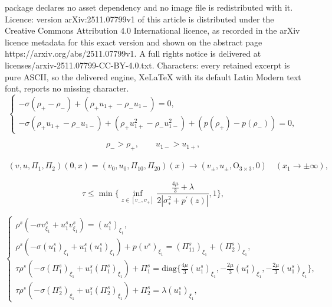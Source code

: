 \documentclass[10pt,a4paper]{amsart}
\begin{document}
package declares no asset dependency and no image file is redistributed with it. Licence: version arXiv:2511.07799v1 of this article is distributed under the Creative Commons Attribution 4.0 International licence, as recorded in the arXiv licence metadata for this exact version and shown on the abstract page https://arxiv.org/abs/2511.07799v1. A full rights notice is delivered at licenses/arxiv-2511.07799-CC-BY-4.0.txt. Characters: every retained excerpt is pure ASCII, so the delivered engine, XeLaTeX with its default Latin Modern text font, reports no missing character.
\begin{equation}\label{1.11rh}
\begin{cases}
-\sigma(\rho_+-\rho_-)+(\rho_+u_{1+}-\rho_-u_{1-})=0,\\
-\sigma(\rho_+u_{1+}-\rho_-u_{1-})+(\rho_+u_{1+}^2-\rho_-u_{1-}^2)+(p(\rho_+)-p(\rho_-))=0,
\end{cases}
\end{equation}

\begin{equation}\label{1.12}
\rho_->\rho_+, \qquad u_{1-}>u_{1+},
\end{equation}

\begin{align} \label{1.13}
(v, u, \Pi_1, \Pi_2)(0,x)=(v_0, u_0, \Pi_{10}, \Pi_{20})(x)
\rightarrow(v_{\pm}, u_{\pm}, \mathrm O_{3\times3}, 0) \quad (x_1\rightarrow\pm\infty),
\end{align}

\begin{equation}\label{sccs}
\tau\leq \min\{\inf\limits_{z\in[v_-,v_+]}\frac{\frac{4\mu}{3}+\lambda}{2|\sigma_\ast^2+p^{\prime}(z)|},
1\},
\end{equation}

\begin{equation}\label{2.3}
\begin{cases}
\rho^s\left(-\sigma v^s_{\xi_1}+ u_1^sv^s_{\xi_1}\right)=(u_1^s)_{\xi_1},\\
\rho^s\left(-\sigma( u_1^s)_{\xi_1}+u_1^s(u_1^s)_{\xi_1}\right)+p(v^s)_{\xi_1}=
                            (\Pi_{11}^s)_{\xi_1}+(\Pi_2^s)_{\xi_1},\\
\tau \rho^s \left(-\sigma(\Pi^s_{1})_{\xi_1}+ u_1^s(\Pi^s_{1})_{\xi_1}\right)+\Pi^s_{1}=
                          \text{diag}\{ \frac{4\mu}{3}(u_1^s)_{\xi_1}, -\frac{2\mu}{3}(u_1^s)_{\xi_1}, -\frac{2\mu}{3}(u_1^s)_{\xi_1}\},\\
\tau \rho^s \left(-\sigma(\Pi_2^s)_{\xi_1}+ u_1^s(\Pi^s_2)_{\xi_1}\right)+\Pi^s_2=\lambda(u_1^s)_{\xi_1},
\end{cases}
\end{equation}
\end{document}
